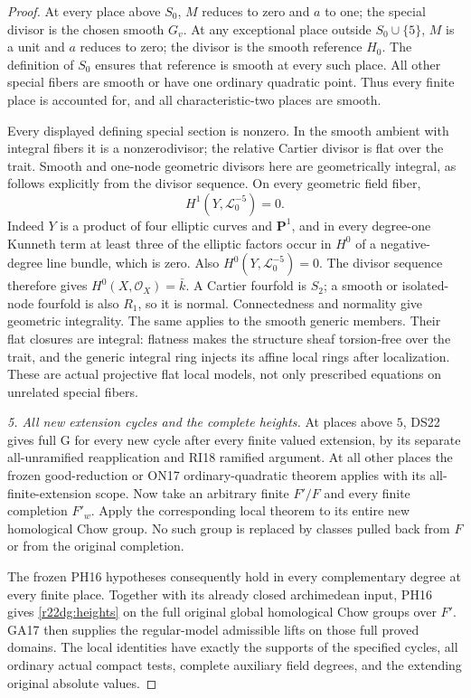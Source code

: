 \begin{proof}
At every place above $S_0$, $M$ reduces to zero and $a$ to one;
the special divisor is the chosen smooth $G_v$.  At any
exceptional place outside $S_0\cup\{5\}$, $M$ is a unit and
$a$ reduces to zero; the divisor is the smooth reference $H_0$.
The definition of $S_0$ ensures that reference is smooth at
every such place.  All other special fibers are smooth or have
one ordinary quadratic point.  Thus every finite place is
accounted for, and all characteristic-two places are smooth.

Every displayed defining special section is nonzero.  In the
smooth ambient with integral fibers it is a nonzerodivisor;
the relative Cartier divisor is flat over the trait.  Smooth
and one-node geometric divisors here are geometrically integral,
as follows explicitly from the divisor sequence.  On every
geometric field fiber,
\[
                    H^1(Y,\mathcal L_0^{-5})=0.
 \tag{DG22.11}\label{r22dg:negative-H1}
\]
Indeed $Y$ is a product of four elliptic curves and $\mathbf P^1$,
and in every degree-one Kunneth term at least three of the elliptic
factors occur in $H^0$ of a negative-degree line bundle, which
is zero.  Also $H^0(Y,\mathcal L_0^{-5})=0$.  The divisor
sequence therefore gives $H^0(X,\mathcal O_X)=\bar k$.
A Cartier fourfold is $S_2$; a smooth or isolated-node fourfold
is also $R_1$, so it is normal.  Connectedness and normality
give geometric integrality.  The same applies to the smooth
generic members.  Their flat closures are integral: flatness
makes the structure sheaf torsion-free over the trait, and the
generic integral ring injects its affine local rings after
localization.  These are actual projective flat local models,
not only prescribed equations on unrelated special fibers.

\emph{5. All new extension cycles and the complete heights.}
At places above $5$, DS22 gives full G for every new cycle after
every finite valued extension, by its separate all-unramified
reapplication and RI18 ramified argument.  At all other places
the frozen good-reduction or ON17 ordinary-quadratic theorem
applies with its all-finite-extension scope.  Now take an arbitrary
finite $F'/F$ and every finite completion $F'_w$.  Apply the
corresponding local theorem to its entire new homological Chow
group.  No such group is replaced by classes pulled back from
$F$ or from the original completion.

The frozen PH16 hypotheses consequently hold in every
complementary degree at every finite place.  Together with its
already closed archimedean input, PH16 gives
\eqref{r22dg:heights} on the full original global homological
Chow groups over $F'$.  GA17 then supplies the regular-model
admissible lifts on those full proved domains.  The local
identities have exactly the supports of the specified cycles,
all ordinary actual compact tests, complete auxiliary field
degrees, and the extending original absolute values.


\end{proof}
